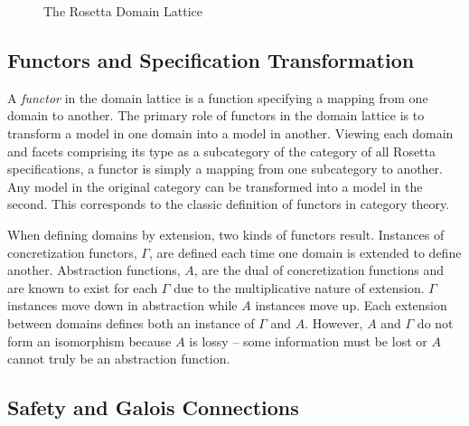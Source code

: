 \documentclass[12pt]{article}
\begin{document}

\begin{figure}[hbtp]
  \caption{The Rosetta Domain Lattice}
  \label{fig:semi-lattice-detailed}
\end{figure}

\subsection{Functors and Specification Transformation}

A \emph{functor} in the domain lattice is a function specifying a
mapping from one domain to another.  The primary role of functors in
the domain lattice is to transform a model in one domain into a model
in another.  Viewing each domain and facets comprising its type as a
subcategory of the category of all Rosetta specifications, a functor
is simply a mapping from one subcategory to another.  Any model in the
original category can be transformed into a model in the second.
This corresponds to the classic definition of functors in category
theory.

When defining domains by extension, two kinds of functors result.
Instances of concretization functors, $\Gamma$, are defined each time
one domain is extended to define another.  Abstraction functions, $A$,
are the dual of concretization functions and are known to exist for
each $\Gamma$ due to the multiplicative nature of extension.  $\Gamma$
instances move down in abstraction while $A$ instances move up.  Each
extension between domains defines both an instance of $\Gamma$ and
$A$.  However, $A$ and $\Gamma$ do not form an isomorphism because $A$
is lossy -- some information must be lost or $A$ cannot truly be an
abstraction function.

\subsection{Safety and Galois Connections}
\end{document}
